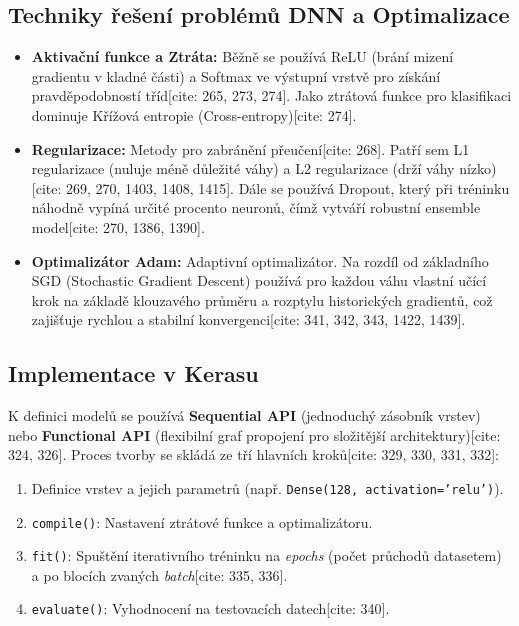 \documentclass{article}
\begin{document}
\subsection{Techniky řešení problémů DNN a Optimalizace}
\begin{itemize}
    \item \textbf{Aktivační funkce a Ztráta:} Běžně se používá ReLU (brání mizení gradientu v kladné části) a Softmax ve výstupní vrstvě pro získání pravděpodobností tříd[cite: 265, 273, 274]. Jako ztrátová funkce pro klasifikaci dominuje Křížová entropie (Cross-entropy)[cite: 274].
    \item \textbf{Regularizace:} Metody pro zabránění přeučení[cite: 268]. Patří sem L1 regularizace (nuluje méně důležité váhy) a L2 regularizace (drží váhy nízko)[cite: 269, 270, 1403, 1408, 1415]. Dále se používá Dropout, který při tréninku náhodně vypíná určité procento neuronů, čímž vytváří robustní ensemble model[cite: 270, 1386, 1390].
    \item \textbf{Optimalizátor Adam:} Adaptivní optimalizátor. Na rozdíl od základního SGD (Stochastic Gradient Descent) používá pro každou váhu vlastní učící krok na základě klouzavého průměru a rozptylu historických gradientů, což zajišťuje rychlou a stabilní konvergenci[cite: 341, 342, 343, 1422, 1439].
\end{itemize}

\subsection{Implementace v Kerasu}
K definici modelů se používá \textbf{Sequential API} (jednoduchý zásobník vrstev) nebo \textbf{Functional API} (flexibilní graf propojení pro složitější architektury)[cite: 324, 326]. 
Proces tvorby se skládá ze tří hlavních kroků[cite: 329, 330, 331, 332]:
\begin{enumerate}
    \item Definice vrstev a jejich parametrů (např. \texttt{Dense(128, activation='relu')}).
    \item \texttt{compile()}: Nastavení ztrátové funkce a optimalizátoru.
    \item \texttt{fit()}: Spuštění iterativního tréninku na \textit{epochs} (počet průchodů datasetem) a po blocích zvaných \textit{batch}[cite: 335, 336].
    \item \texttt{evaluate()}: Vyhodnocení na testovacích datech[cite: 340].
\end{enumerate}
\end{document}
